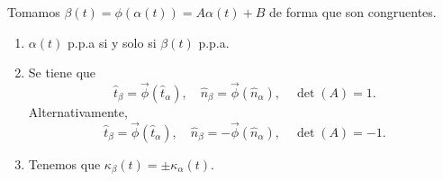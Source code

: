 \begin{prop}
Tomamos $\displaystyle \beta\left(t\right)=\phi\left(\alpha\left(t\right)\right)=A\alpha\left(t\right)+B $ de forma que son congruentes.
\begin{enumerate}
\item $\displaystyle \alpha\left(t\right) $ p.p.a si y solo si $\displaystyle \beta\left(t\right) $ p.p.a.
\item Se tiene que
	\[\hat{t}_{\beta }=\vec{\phi}\left(\hat{t}_{\alpha }\right), \quad \hat{n}_{\beta }=\vec{\phi}\left(\hat{n}_{\alpha }\right), \quad \det\left(A\right)=1.\]
	Alternativamente, 
	\[\hat{t}_{\beta }=\vec{\phi}\left(\hat{t}_{\alpha }\right), \quad \hat{n}_{\beta }=-\vec{\phi}\left(\hat{n}_{\alpha }\right), \quad \det\left(A\right)=-1 .\]
\item Tenemos que $\displaystyle \kappa_{\beta }\left(t\right)=\pm \kappa_{\alpha }\left(t\right) $. 
\end{enumerate}
\end{prop}
